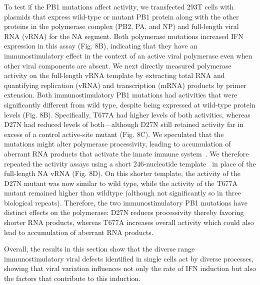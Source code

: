 \documentclass[]{article}
\begin{document}
To test if the PB1 mutations affect activity, we transfected 293T cells with plasmids that express wild-type or mutant PB1 protein along with the other proteins in the polymerase complex (PB2, PA, and NP) and full-length viral RNA (vRNA) for the NA segment.
Both polymerase mutations increased IFN expression in this assay (Fig. 8B), indicating that they have an immunostimulatory effect in the context of an active viral polymerase even when other viral components are absent.
We next directly measured polymerase activity on the full-length vRNA template by extracting total RNA and quantifying replication (vRNA) and transcription (mRNA) products by primer extension.
Both immunostimulatory PB1 mutations had activities that were significantly different from wild type, despite being expressed at wild-type protein levels (Fig. 8B).
Specifically, T677A had higher levels of both activities, whereas D27N had reduced levels of both---although D27N still retained activity far in excess of a control active-site mutant (Fig. 8C).
We speculated that the mutations might alter polymerase processivity, leading to accumulation of aberrant RNA products that activate the innate immune system~\cite{velthuis2018mini, baum2010preference, tapia2013defective, boergeling2015evidence, dimmock2015cloned, liu2019inhibition}.
We therefore repeated the activity assays using a short 246-nucleotide template~\cite{velthuis2018mini} in place of the full-length NA vRNA (Fig. 8D).
On this shorter template, the activity of the D27N mutant was now similar to wild type, while the activity of the T677A mutant remained higher than wildtype (although not significantly so in three biological repeats). 
Therefore, the two immunostimulatory PB1 mutations have distinct effects on the polymerase: D27N reduces processivity thereby favoring shorter RNA products, whereas T677A increases overall activity which could also lead to accumulation of aberrant RNA products.

Overall, the results in this section show that the diverse range immunostimulatory viral defects identified in single cells act by diverse processes, showing that viral variation influences not only the rate of IFN induction but also the factors that contribute to this induction.
\end{document}
